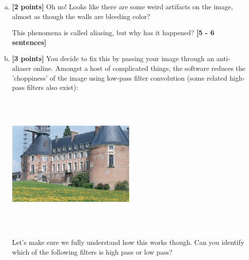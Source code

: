 \documentclass[11pt]{article}
\begin{document}
\begin{enumerate}[(a)]
\item \textbf{[2 points]} Oh no! Looks like there are some weird artifacts on the image, almost as though the walls are bleeding color? 
    
    \begin{tcolorbox}[colback=orange!5!white,colframe=orange!75!black]
This phenomena is called aliasing, but why has it happened? \textbf{[5 - 6 sentences]}
\end{tcolorbox}

\item \textbf{[3 points]}
You decide to fix this by passing your image through an anti-aliaser online. Amongst a host of complicated things, the software reduces the 'choppiness' of the image using low-pass filter convolution (some related high-pass filters also exist):

\includegraphics[width=0.5\textwidth,height=7cm,keepaspectratio]{images/castle-after.jpg}

\begin{tcolorbox}[colback=orange!5!white,colframe=orange!75!black]
Let's make sure we fully understand how this works though. Can you identify which of the following filters is high pass or low pass?
\end{tcolorbox}


\end{enumerate}
\end{document}

